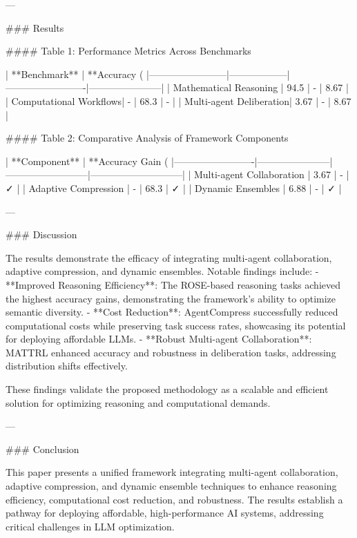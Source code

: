 ---

### Results

#### Table 1: Performance Metrics Across Benchmarks

| **Benchmark**         | **Accuracy (%
|------------------------|------------------|-------------------------|-----------------------|
| Mathematical Reasoning | 94.5            | -                       | 8.67                 |
| Computational Workflows| -               | 68.3                   | -                    |
| Multi-agent Deliberation| 3.67           | -                       | 8.67                 |

#### Table 2: Comparative Analysis of Framework Components

| **Component**          | **Accuracy Gain (%
|-------------------------|-----------------------|--------------------------|-----------------------------|
| Multi-agent Collaboration | 3.67              | -                        | ✓                           |
| Adaptive Compression     | -                  | 68.3                     | ✓                           |
| Dynamic Ensembles         | 6.88              | -                        | ✓                           |

---

### Discussion

The results demonstrate the efficacy of integrating multi-agent collaboration, adaptive compression, and dynamic ensembles. Notable findings include:
- **Improved Reasoning Efficiency**: The ROSE-based reasoning tasks achieved the highest accuracy gains, demonstrating the framework's ability to optimize semantic diversity.
- **Cost Reduction**: AgentCompress successfully reduced computational costs while preserving task success rates, showcasing its potential for deploying affordable LLMs.
- **Robust Multi-agent Collaboration**: MATTRL enhanced accuracy and robustness in deliberation tasks, addressing distribution shifts effectively.

These findings validate the proposed methodology as a scalable and efficient solution for optimizing reasoning and computational demands.

---

### Conclusion

This paper presents a unified framework integrating multi-agent collaboration, adaptive compression, and dynamic ensemble techniques to enhance reasoning efficiency, computational cost reduction, and robustness. The results establish a pathway for deploying affordable, high-performance AI systems, addressing critical challenges in LLM optimization.

